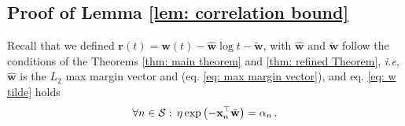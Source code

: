 \documentclass[twoside,11pt,english]{article}
\begin{document}
\subsection{Proof of Lemma \ref{lem: correlation bound}\label{sec:Proof-of-Lemma correlation}}

Recall that we defined $\mathbf{r}\left(t\right)=\mathbf{w}\left(t\right)-\hat{\mathbf{w}}\log t-\tilde{\mathbf{w}}$,
with $\hat{\mathbf{w}}$ and $\tilde{\mathbf{w}}$ follow the conditions
of the Theorems \ref{thm: main theorem} and \ref{thm: refined Theorem},
\emph{i.e}, $\hat{\mathbf{w}}$ is the $L_{2}$ max margin vector
and (eq. \ref{eq: max margin vector}), and eq. \ref{eq: w tilde}
holds 
\[
\forall n\in\mathcal{S}:\,\eta\exp\left(-\mathbf{x}_{n}^{\top}\tilde{\mathbf{w}}\right)=\alpha_{n}\,.
\]

\correlation*
\end{document}
